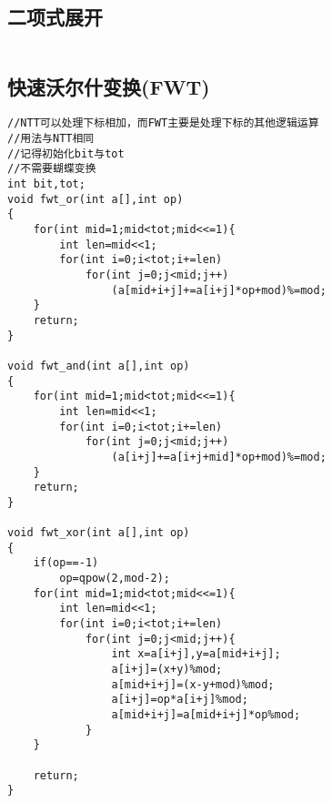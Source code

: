 \documentclass[twocolumn,a4]{article}
\begin{document}
\subsection{二项式展开}
\begin{lstlisting}

\end{lstlisting}

\subsection{快速沃尔什变换(FWT)}
\begin{lstlisting}
//NTT可以处理下标相加，而FWT主要是处理下标的其他逻辑运算
//用法与NTT相同
//记得初始化bit与tot
//不需要蝴蝶变换
int bit,tot;
void fwt_or(int a[],int op)
{
    for(int mid=1;mid<tot;mid<<=1){
        int len=mid<<1;
        for(int i=0;i<tot;i+=len)
            for(int j=0;j<mid;j++)
                (a[mid+i+j]+=a[i+j]*op+mod)%=mod;
    }
    return;
}

void fwt_and(int a[],int op)
{
    for(int mid=1;mid<tot;mid<<=1){
        int len=mid<<1;
        for(int i=0;i<tot;i+=len)
            for(int j=0;j<mid;j++)
                (a[i+j]+=a[i+j+mid]*op+mod)%=mod;
    }
    return;
}

void fwt_xor(int a[],int op)
{
    if(op==-1)
        op=qpow(2,mod-2);
    for(int mid=1;mid<tot;mid<<=1){
        int len=mid<<1;
        for(int i=0;i<tot;i+=len)
            for(int j=0;j<mid;j++){
                int x=a[i+j],y=a[mid+i+j];
                a[i+j]=(x+y)%mod;
                a[mid+i+j]=(x-y+mod)%mod;
                a[i+j]=op*a[i+j]%mod;
                a[mid+i+j]=a[mid+i+j]*op%mod;
            }
    }

    return;
}
\end{lstlisting}
\end{document}
